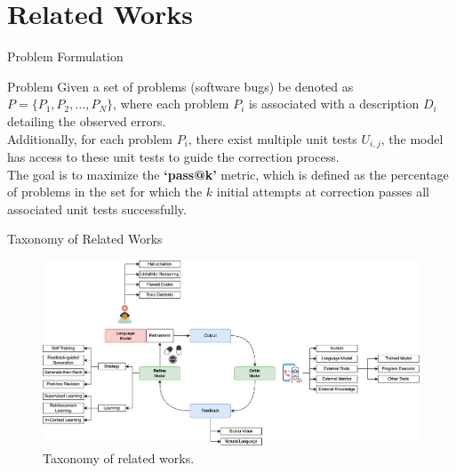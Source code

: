 \section{Related Works}

\begin{frame}{Problem Formulation}
    \begin{block}{Problem}
        Given a set of problems (software bugs) be denoted as \( P = \{P_1, P_2, \ldots, P_N\} \), where each problem \( P_i \) is associated with a description \( D_i \) detailing the observed errors.\\

        Additionally, for each problem \( P_i \), there exist multiple unit tests \( U_{i,j} \), the model has access to these unit tests to guide the correction process.\\
        \vspace{0.5cm}
        The goal is to maximize the \textbf{`pass@k'} metric, which is defined as the percentage of problems in the set for which the $k$ initial attempts at correction passes all associated unit tests successfully.
    \end{block}
\end{frame}

\begin{frame}{Taxonomy of Related Works}
    \begin{figure}
        \centering
        \includegraphics[width=1\textwidth]{img/taxonomy}
        \captionsetup{font=small,labelformat=empty}
        \caption{Taxonomy of related works.}\label{fig:taxonomy}
    \end{figure}
\end{frame}

